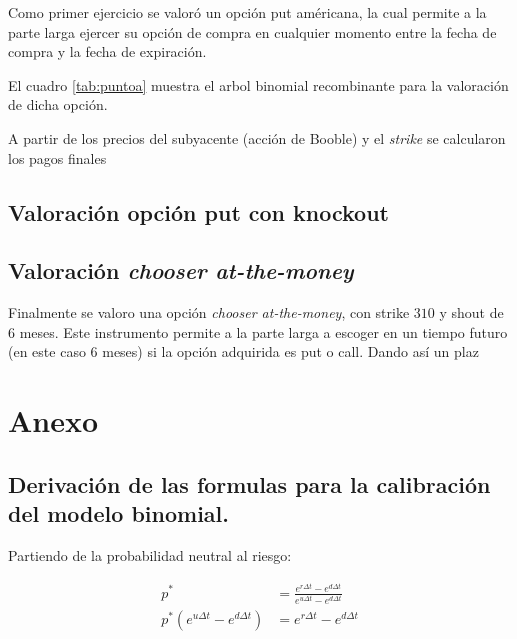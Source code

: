 \documentclass{article}
\theoremstyle{remark}
\theoremstyle{definition}
\begin{document}
    Como primer ejercicio se valor\'o un opci\'on put am\'ericana, la cual permite a la parte larga ejercer su opci\'on de compra en cualquier momento entre la fecha de compra y la fecha de expiraci\'on.

    El cuadro \ref{tab:puntoa} muestra el arbol binomial recombinante para la valoraci\'on de dicha opci\'on.

    A partir de los precios del subyacente (acci\'on de Booble) y el \emph{strike} se calcularon los pagos finales
    
    

    \subsection{Valoraci\'on opci\'on put con knockout}

    

    \subsection{Valoraci\'on \emph{chooser at-the-money}}

    Finalmente se valoro una opci\'on \emph{chooser at-the-money}, con strike $310$ y shout de $6$ meses. Este instrumento permite a la parte larga a escoger en un tiempo futuro (en este caso 6 meses) si la opci\'on adquirida es put o call. Dando as\'i un plaz

    

    
    
    

    
    \newpage
    
    \section*{Anexo}
    \subsection*{Derivaci\'on de las formulas para la calibraci\'on del modelo binomial.}

    Partiendo de la probabilidad neutral al riesgo:

    \begin{align*}
        p^{*} &= \frac{e^{r\Delta t} - e ^ {d\Delta t}}{e^{u \Delta t} - e^{d \Delta t}} \\
        p^{*} \left(e^{u \Delta t} - e^{d \Delta t} \right) &= e^{r\Delta t} - e ^ {d\Delta t} 
    \end{align*}
\end{document}
